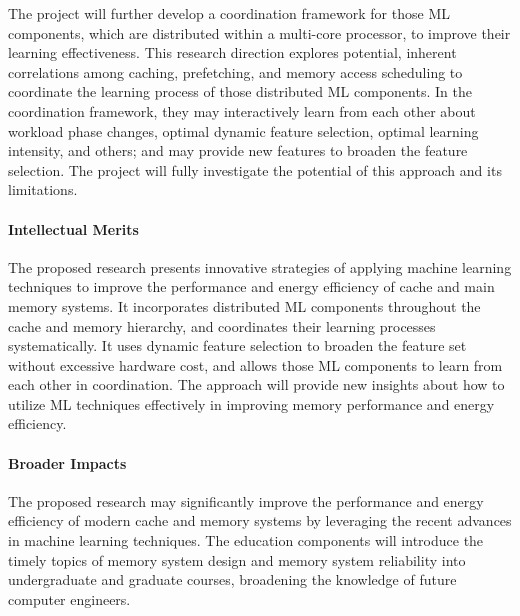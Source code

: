\documentclass[11pt]{article}
\begin{document}
The project will further develop a coordination framework for those ML
components, which are distributed within a multi-core processor, to improve
their learning effectiveness.  This research direction explores potential,
inherent correlations among caching, prefetching, and memory access scheduling
to coordinate the learning process of those distributed ML components.  In the
coordination framework, they may interactively learn from each other about
workload phase changes, optimal dynamic feature selection, optimal learning
intensity, and others; and may provide new features to broaden the feature
selection.  The project will fully investigate the potential of this approach
and its limitations.

\paragraph*{Intellectual Merits}

The proposed research presents innovative strategies of applying machine
learning techniques to improve the performance and energy efficiency of cache
and main memory systems.  It incorporates distributed ML components throughout
the cache and memory hierarchy, and coordinates their learning processes
systematically.  It uses dynamic feature selection to broaden the feature set
without excessive hardware cost, and allows those ML components to learn from
each other in coordination.  The approach will provide new insights about how to
utilize ML techniques effectively in improving memory performance and energy
efficiency.

\paragraph*{Broader Impacts}

The proposed research may significantly improve the performance and energy
efficiency of modern cache and memory systems by leveraging the recent advances
in machine learning techniques.  The education components will introduce the
timely topics of memory system design and memory system reliability into
undergraduate and graduate courses, broadening the knowledge of future computer
engineers.
\end{document}

